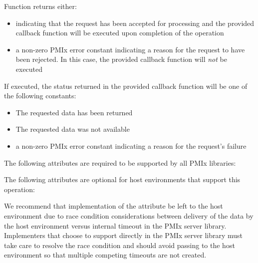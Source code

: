 Function returns either:

\begin{itemize}
\item {} indicating that the request has been accepted for processing and the provided callback function will be executed upon completion of the operation
\item a non-zero \ac{PMIx} error constant indicating a reason for the request to have been rejected. In this case, the provided callback function will \emph{not} be executed
\end{itemize}

If executed, the status returned in the provided callback function will be one of the following constants:

\begin{itemize}
\item {} The requested data has been returned
\item {} The requested data was not available
\item a non-zero \ac{PMIx} error constant indicating a reason for the request's failure
\end{itemize}

\reqattrstart
The following attributes are required to be supported by all \ac{PMIx} libraries:


\reqattrend

\optattrstart
The following attributes are optional for host environments that support this operation:


\optattrend

\adviceimplstart
We recommend that implementation of the  attribute be left to the host environment due to race condition considerations between delivery of the data by the host environment versus internal timeout in the \ac{PMIx} server library. Implementers that choose to support  directly in the \ac{PMIx} server library must take care to resolve the race condition and should avoid passing  to the host environment so that multiple competing timeouts are not created.
\adviceimplend

